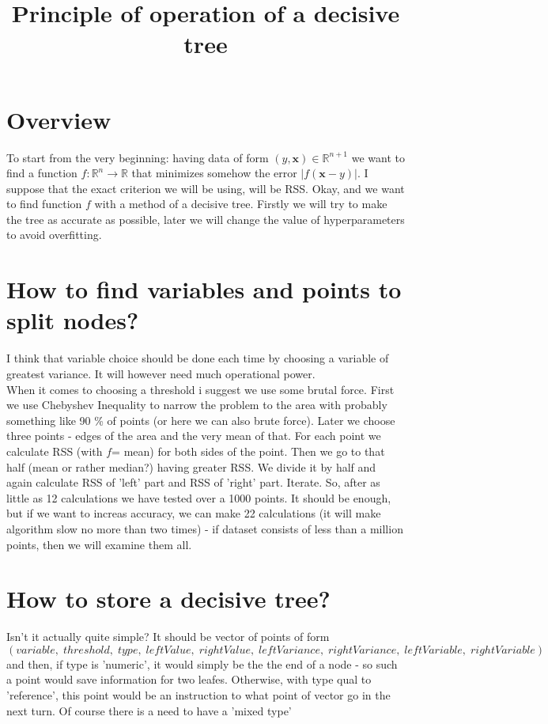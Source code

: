 \documentclass{article}
\begin{document}
\title{Principle of operation of a decisive tree}
\maketitle
\section{Overview}
To start from the very beginning: having data of form $(y, \mathbf{x})\in\mathbb{R}^{n+1}$ we want to find a function $f:\mathbb{R}^n\to\mathbb{R}$ that minimizes somehow the error $|f(\mathbf{x}-y)|$. I suppose that the exact criterion we will be using, will be RSS. Okay, and we want to find function $f$ with a method of a decisive tree. Firstly we will try to make the tree as accurate as possible, later we will change the value of hyperparameters to avoid overfitting.

\section{How to find variables and points to split nodes?}
I think that variable choice should be done each time by choosing a variable of greatest variance. It will however need much operational power.\\
When it comes to choosing a threshold i suggest we use some brutal force. First we use Chebyshev Inequality to narrow the problem to the area with probably something like 90 \% of points (or here we can also brute force). Later we choose three points - edges of the area and the very mean of that. For each point we calculate RSS (with $f$= mean) for both sides of the point. Then we go to that half (mean or rather median?) having greater RSS. We divide it by half and again calculate RSS of 'left' part and RSS of 'right' part. Iterate. So, after as little as 12 calculations we have tested over a 1000 points. It should be enough, but if we want to increas accuracy, we can make 22 calculations (it will make algorithm slow no more than two times) - if dataset consists of less than a million points, then we will examine them all.

\section{How to store a decisive tree?}
Isn't it actually quite simple? It should be vector of points of form 
$$(variable,\; threshold,\;type,\;leftValue,\;rightValue,\;leftVariance,\;rightVariance,\; leftVariable, \;rightVariable)$$
and then, if type is 'numeric', it would simply be the the end of a node - so such a point would save information for two leafes. Otherwise, with type qual to 'reference', this point would be an instruction to what point of vector go in the next turn. Of course there is a need to have a 'mixed type'
\end{document}
